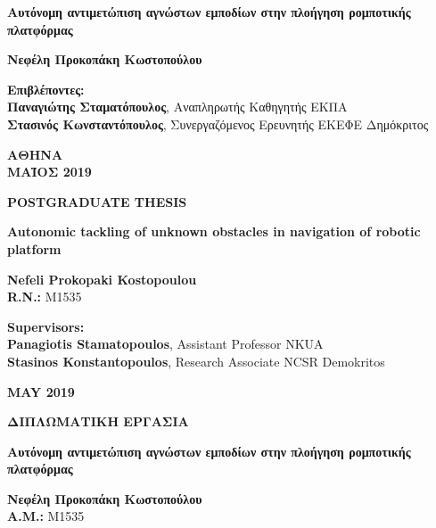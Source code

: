 \begin{titlepage}
\begin{center}
		\vspace{1.5cm}
		\Large
		\textbf{Αυτόνομη αντιμετώπιση αγνώστων εμποδίων στην πλοήγηση ρομποτικής πλατφόρμας}
		
		\vspace{1.5cm}
		\normalsize
		\textbf{Νεφέλη Προκοπάκη Κωστοπούλου}
		
		\vspace{1.5cm}
		\textbf{Επιβλέποντες:}\\
		\textbf{Παναγιώτης Σταματόπουλος}, Αναπληρωτής Καθηγητής ΕΚΠΑ\\
		\textbf{Στασινός Κωνσταντόπουλος}, Συνεργαζόμενος Ερευνητής ΕΚΕΦΕ Δημόκριτος
		
		\vfill
		
		\vspace{0.8cm}
		\textbf{ΑΘΗΝΑ}\\
		\textbf{ΜΑΪΟΣ 2019}
		\thispagestyle{empty}
		\newpage
		
		
		\normalsize
		
		\vspace{1.5cm}
		\textbf{POSTGRADUATE THESIS}
		
		\vspace{1.5cm}
		\textbf{Autonomic tackling of unknown obstacles in navigation of robotic platform}
		
		\vspace{1.5cm}
		\textbf{Nefeli Prokopaki Kostopoulou}\\
		\textbf{R.N.: } M1535
				
		\vspace{1.5cm}
		\textbf{Supervisors:}\\
		\textbf{Panagiotis Stamatopoulos}, Assistant Professor NKUA\\
		\textbf{Stasinos Konstantopoulos}, Research Associate NCSR Demokritos
		
		\vfill
		
		\vspace{0.8cm}
		\textbf{MAY 2019}
		\thispagestyle{empty}
		\newpage
		
		
		
		\vspace{1.5cm}
		\textbf{ΔΙΠΛΩΜΑΤΙΚΗ ΕΡΓΑΣΙΑ}
		
		\vspace{1.5cm}
		\textbf{Αυτόνομη αντιμετώπιση αγνώστων εμποδίων στην πλοήγηση ρομποτικής πλατφόρμας}
		
		\vspace{1.5cm}
		\textbf{Νεφέλη Προκοπάκη Κωστοπούλου}\\
		\textbf{Α.Μ.: } Μ1535
		

\end{center}
\end{titlepage}

